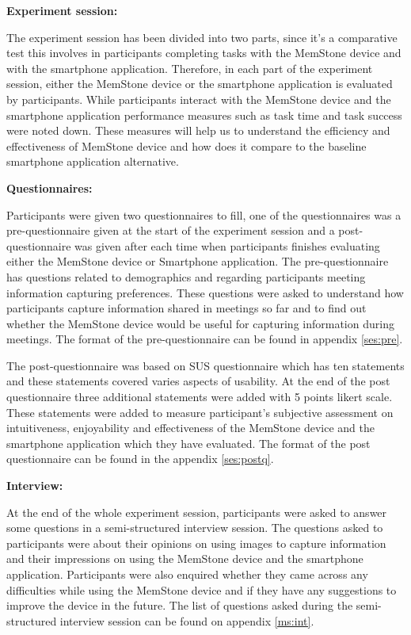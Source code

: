 \documentclass[mscthesis]{usiinfthesis}
\begin{document}
\textbf{Experiment session:}

The experiment session has been divided into two parts, since it's a comparative test this involves in participants completing tasks with the MemStone device and with the smartphone application. Therefore, in each part of the experiment session, either the MemStone device or the smartphone application is evaluated by participants. While participants interact with the MemStone device and the smartphone application performance measures such as task time and task success were noted down. These measures will help us to understand the efficiency and effectiveness of MemStone device and how does it compare to the baseline smartphone application alternative.
\newline

\textbf{Questionnaires:}

Participants were given two questionnaires to fill, one of the questionnaires was a pre-questionnaire given at the start of the experiment session and a post-questionnaire was given after each time when participants finishes evaluating either the MemStone device or Smartphone application. The pre-questionnaire has questions related to demographics and regarding participants meeting information capturing preferences. These questions were asked to understand how participants capture information shared in meetings so far and to find out whether the MemStone device would be useful for capturing information during meetings. The format of the pre-questionnaire can be found in appendix \ref{ses:pre}. 

The post-questionnaire was based on SUS questionnaire \citep{brooke_sus-quick_1996} which has ten statements and these statements covered varies aspects of usability. At the end of the post questionnaire three additional statements were added with 5 points likert scale. These statements were added to measure participant's subjective assessment on intuitiveness, enjoyability and effectiveness of the MemStone device and the smartphone application which they have evaluated. The format of the post questionnaire can be found in the appendix \ref{ses:postq}. 
\newline

\textbf{Interview:}

At the end of the whole experiment session, participants were asked to answer some questions in a semi-structured interview session. The questions asked to participants were about their opinions on using images to capture information and their impressions on using the MemStone device and the smartphone application. Participants were also enquired whether they came across any difficulties while using the MemStone device and if they have any suggestions to improve the device in the future. The list of questions asked during the semi-structured interview session can be found on appendix \ref{ms:int}.
\newline
\end{document}
